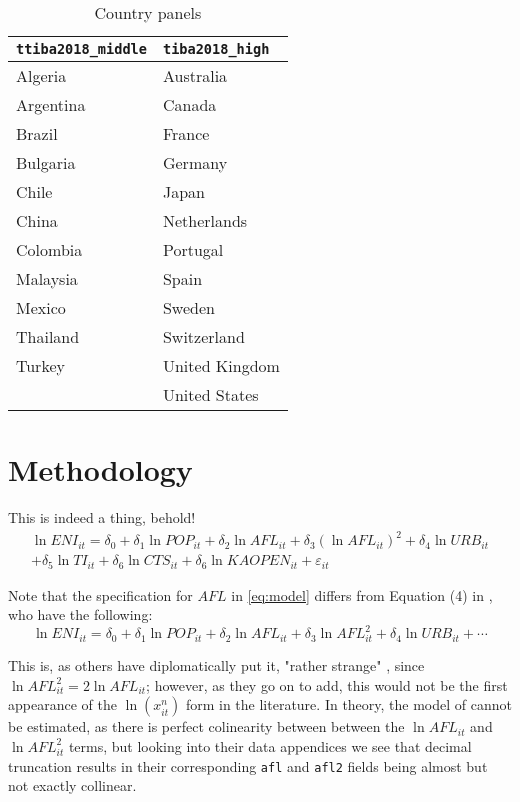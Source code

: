 \documentclass[12pt,a4paper]{article}
\begin{document}
\renewcommand{\arraystretch}{1}
\begin{table}[htbp]
\centering
\begin{tabular}{ll}
\toprule
\texttt{ttiba2018\_middle} &   \texttt{tiba2018\_high} \\
\midrule
        Algeria &       Australia \\
      Argentina &          Canada \\
         Brazil &          France \\
       Bulgaria &         Germany \\
          Chile &           Japan \\
          China &     Netherlands \\
       Colombia &        Portugal \\
       Malaysia &           Spain \\
         Mexico &          Sweden \\
       Thailand &     Switzerland \\
         Turkey &  United Kingdom \\
                &   United States \\
\bottomrule
\end{tabular}
\caption{Country panels}
\label{tab:countries}
\end{table}

\section{Methodology}\label{sec:methodology}

This is indeed a thing, behold!
\begin{multline}\label{eq:model}
\ln ENI_{it} = \delta_0 + \delta_1 \ln POP_{it} + \delta_2 \ln AFL_{it} + \delta_3 \left( \ln AFL_{it} \right)^2 + \delta_4 \ln URB_{it} \\ + \delta_5 \ln TI_{it} + \delta_6 \ln CTS_{it} + \delta_6 \ln KAOPEN_{it} + \varepsilon_{it}
\end{multline}

Note that the specification for $AFL$ in \cref{eq:model} differs from Equation (4) in \cite{rafiqUrbanizationOpennessEmissions2016}, who have the following:
\begin{equation*}\label{eq:rafiqmodel}
\ln ENI_{it} = \delta_0 + \delta_1 \ln POP_{it} + \delta_2 \ln AFL_{it} + \delta_3 \ln AFL_{it}^2 + \delta_4 \ln URB_{it} + \cdots
\end{equation*}

This is, as others have diplomatically put it, "rather strange" \cite[p.4936]{moosaEconometricsEnvironmentalKuznets2017}, since $\ln AFL_{it}^2 = 2 \ln AFL_{it}$; however, as they go on to add, this would not be the first appearance of the $\ln \left( x^n_{it} \right)$ form in the literature.
In theory, the model of \cite{rafiqUrbanizationOpennessEmissions2016} cannot be estimated, as there is perfect colinearity between between the $\ln AFL_{it}$ and $\ln AFL_{it}^2$ terms, but looking into their data appendices\footnotemark{} we see that decimal truncation results in their corresponding \texttt{afl} and \texttt{afl2} fields being almost but not exactly collinear.
\end{document}
